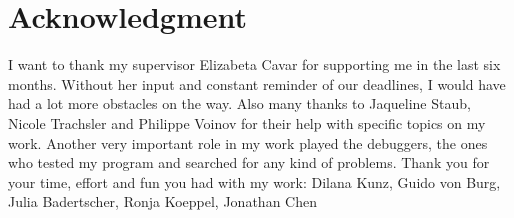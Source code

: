 
\chapter*{Acknowledgment}

I want to thank my supervisor Elizabeta Cavar for supporting me in the last six months.
Without her input and constant reminder of our deadlines, I would have had a lot more obstacles on the way.
Also many thanks to Jaqueline Staub, Nicole Trachsler and Philippe Voinov for their help with specific topics on my work.
Another very important role in my work played the debuggers, the ones who tested my program and searched for any kind of problems.
Thank you for your time, effort and fun you had with my work:
Dilana Kunz, Guido von Burg, Julia Badertscher, Ronja Koeppel, Jonathan Chen

